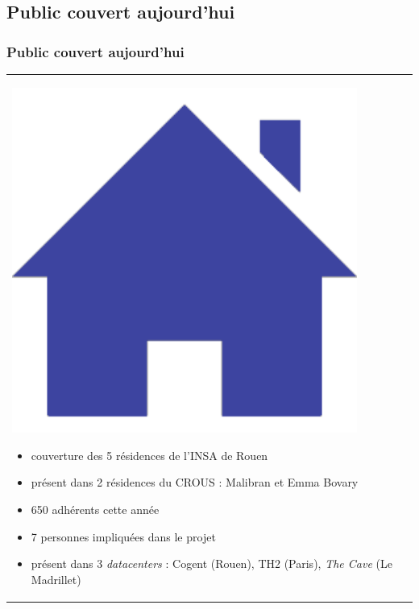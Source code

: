\documentclass[handout]{beamer}
\begin{document}
	\subsection{Public couvert aujourd'hui}
		\begin{frame}
		\frametitle{Public couvert aujourd'hui}
		\begin{tabular}{l l}
			\begin{minipage}{0.2\textwidth}
				\begin{center}
					\includegraphics[width=0.9\textwidth]{images/residence.png}
				\end{center}
			\end{minipage}

			\begin{minipage}{0.8\textwidth}
				\begin{itemize}
					\item couverture des 5 résidences de l'INSA de Rouen
					\item présent dans 2 résidences du CROUS : Malibran et Emma Bovary
					\item 650 adhérents cette année
					\item 7 personnes impliquées dans le projet
					\item présent dans 3 \textit{datacenters} : Cogent (Rouen), TH2 (Paris), \textit{The Cave} (Le Madrillet)
				\end{itemize}
			\end{minipage}
			
		\end{tabular}
		\end{frame}
\end{document}

